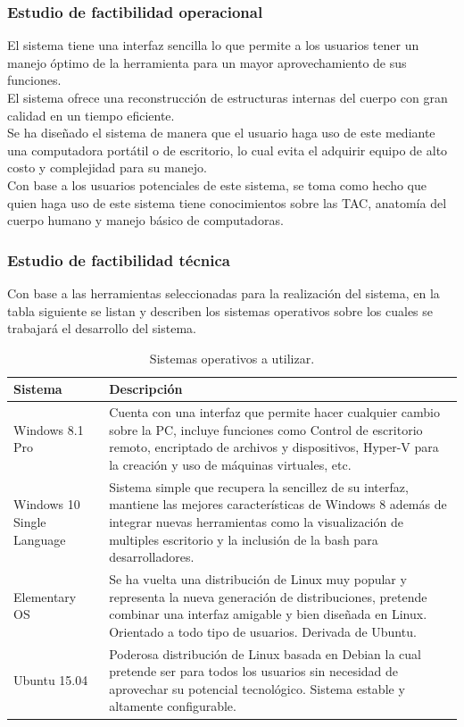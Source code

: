 \documentclass[12pt]{report}
\begin{document}
\subsubsection{Estudio de factibilidad operacional}
El sistema tiene una interfaz sencilla lo que permite a los usuarios tener un manejo óptimo de la herramienta para un mayor aprovechamiento de sus funciones.\\
El sistema ofrece una reconstrucción de estructuras internas del cuerpo con gran calidad en un tiempo eficiente.\\
Se ha diseñado el sistema de manera que el usuario haga uso de este mediante una computadora portátil o de escritorio, lo cual evita el adquirir equipo de alto costo y complejidad para su manejo.\\
Con base a los usuarios potenciales de este sistema, se toma como hecho que quien haga uso de este sistema tiene conocimientos sobre las TAC, anatomía del cuerpo humano y manejo básico de computadoras.\\

\subsubsection{Estudio de factibilidad técnica}
Con base a las herramientas seleccionadas para la realización del sistema, en la tabla siguiente se listan y describen los sistemas operativos sobre los cuales se trabajará el desarrollo del sistema.
\begin{table}[H]
\begin{center}
\begin{tabular}{|p{40mm}|p{100mm}|}
\hline
Sistema & Descripción\\
\hline \hline 
Windows 8.1 Pro & Cuenta con una interfaz que permite hacer cualquier cambio sobre la PC, incluye funciones como Control de escritorio remoto, encriptado de archivos y dispositivos, Hyper-V para la creación y uso de máquinas virtuales, etc.\cite{win8}\\
\hline
Windows 10 Single Language & Sistema simple que recupera la sencillez de su interfaz, mantiene las mejores características de Windows 8 además de integrar nuevas herramientas como la visualización de multiples escritorio y la inclusión de la bash para desarrolladores.\cite{win10}\\
\hline
Elementary OS & Se ha vuelta una distribución de Linux muy popular y representa la nueva generación de distribuciones, pretende combinar una interfaz amigable y bien diseñada en Linux. Orientado a todo tipo de usuarios. Derivada de Ubuntu.\cite{elemen}\\
\hline
Ubuntu 15.04 & Poderosa distribución de Linux basada en Debian la cual pretende ser para todos los usuarios sin necesidad de aprovechar su potencial tecnológico. Sistema estable y altamente configurable.\cite{ubun}\\
\hline
\end{tabular}
\caption{Sistemas operativos a utilizar.}
\end{center}
\end{table}
\end{document}
